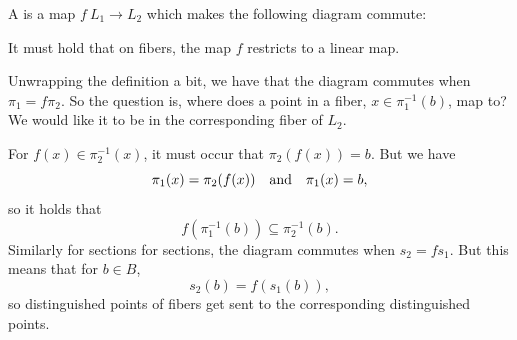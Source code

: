 \documentclass[12pt]{memoir}
\begin{document}
\begin{Def}
    A  is a map $f\: L_1\to L_2$ which makes the following diagram commute:
    \begin{center}
            \end{center}
    It must hold that on fibers, the map $f$ restricts to a linear map.
\end{Def}

Unwrapping the definition a bit, we have that the diagram commutes when $\pi_1=f\pi_2$. So the question is, where does a point in a fiber, $x\in\pi^{-1}_1(b)$, map to? We would like it to be in the corresponding fiber of $L_2$.\par 
For $f(x)\in\pi_2^{-1}(x)$, it must occur that $\pi_2(f(x))=b$. But we have 
$$\pi_1(x)=\pi_2(f(x))\quad\text{and}\quad\pi_1(x)=b,$$
so it holds that 
$$f\left(\pi^{-1}_1(b)\right)\subseteq \pi_2^{-1}(b).$$
Similarly for sections for sections, the diagram commutes when $s_2=fs_1$. But this means that for $b\in B$, 
$$s_2(b)=f(s_1(b)),$$
so distinguished points of fibers get sent to the corresponding distinguished points.

\ifx\nextra\undefined
\printindex
\else\fi
\nocite{*}


\end{document}
